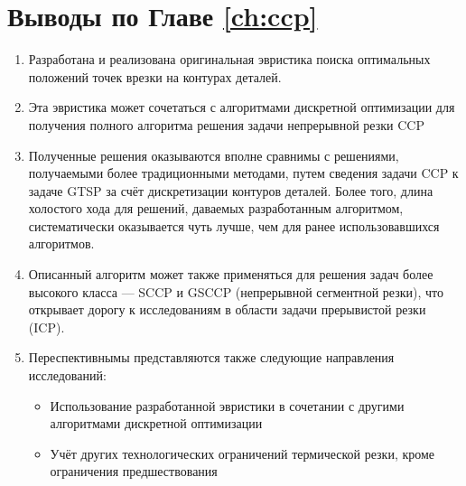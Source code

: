 
\section{Выводы по Главе \ref{ch:ccp}}
\label{sec:ccp.conclude}

\begin{enumerate}
  \item
  Разработана и реализована оригинальная эвристика
  поиска оптимальных положений точек врезки
  на контурах деталей.
  \item
  Эта эвристика может сочетаться с алгоритмами
  дискретной оптимизации для получения
  полного алгоритма решения задачи непрерывной резки
  CCP
  \item
  Полученные решения оказываются вполне сравнимы
  с решениями, получаемыми более традиционными методами,
  путем сведения задачи CCP к задаче GTSP за счёт
  дискретизации контуров деталей.
  Более того, длина холостого хода
  для решений, даваемых разработанным алгоритмом,
  систематически оказывается чуть лучше,
  чем для ранее использовавшихся алгоритмов.
  \item
  Описанный алгоритм может также применяться
  для решения задач более высокого класса ---
  SCCP и GSCCP (непрерывной сегментной резки),
  что открывает дорогу к исследованиям в области
  задачи прерывистой резки (ICP).
  \item
  Переспективнымы представляются также следующие
  направления исследований:
  \begin{itemize}
    \item
    Использование разработанной эвристики
    в сочетании с другими алгоритмами дискретной оптимизации
    \item
    Учёт других технологических ограничений термической резки,
    кроме ограничения предшествования
  \end{itemize}
\end{enumerate}
